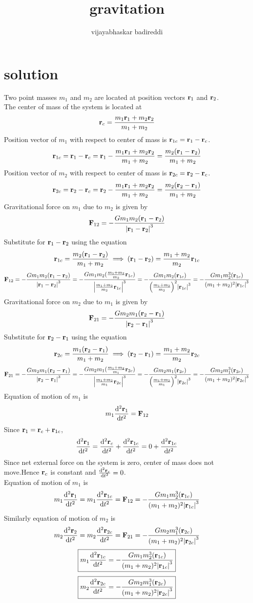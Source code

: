\documentclass[12pt]{article}
\title{gravitation}
\author{vijayabhaskar badireddi}
\begin{document}
\section*{solution}
Two point masses $m_1$ and $m_2$ are located at position vectors $\vb{r}_1$ and $\vb{r}_2$.\\ The center of mass of the system is located at 
\[\vb{r}_c=\frac{m_1\vb{r}_1+m_2\vb{r}_2}{m_1+m_2}\]
Position vector of $m_1$ with respect to center of mass is $\vb{r}_{1c}=\vb{r}_1-\vb{r}_c$.
\[\vb{r}_{1c}=\vb{r}_1-\vb{r}_c=\vb{r}_1-\frac{m_1\vb{r}_1+m_2\vb{r}_2}{m_1+m_2}=\frac{m_2(\vb{r}_1-\vb{r}_2)}{m_1+m_2}\]
Position vector of $m_2$ with respect to center of mass is $\vb{r}_{2c}=\vb{r}_2-\vb{r}_c$.
\[\vb{r}_{2c}=\vb{r}_2-\vb{r}_c=\vb{r}_2-\frac{m_1\vb{r}_1+m_2\vb{r}_2}{m_1+m_2}=\frac{m_2(\vb{r}_2-\vb{r}_1)}{m_1+m_2}\]
Gravitational force on $m_1$ due to $m_2$ is given by 
\[\vb{F}_{12}=-\frac{Gm_1m_2(\vb{r}_1-\vb{r}_2)}{\vqty{\vb{r}_1-\vb{r}_2}^3}\]
Substitute for $\vb{r}_1-\vb{r}_2$ using the equation \[\vb{r}_{1c}=\frac{m_2(\vb{r}_1-\vb{r}_2)}{m_1+m_2}\implies(\vb{r}_1-\vb{r}_2)=\frac{m_1+m_2}{m_2}\vb{r}_{1c}\]
\[\vb{F}_{12}=-\frac{Gm_1m_2(\vb{r}_1-\vb{r}_2)}{\vqty{\vb{r}_1-\vb{r}_2}^3}=-\frac{Gm_1m_2(\frac{m_1+m_2}{m_2}\vb{r}_{1c})}{\vqty{\frac{m_1+m_2}{m_2}\vb{r}_{1c}}^3}=-\frac{Gm_1m_2(\vb{r}_{1c})}{\qty(\frac{m_1+m_2}{m_2})^2\vqty{\vb{r}_{1c}}^3}=-\frac{Gm_1m_2^3(\vb{r}_{1c})}{(m_1+m_2)^2\vqty{\vb{r}_{1c}}^3}\]
Gravitational force on $m_2$ due to $m_1$ is given by 
\[\vb{F}_{21}=-\frac{Gm_2m_1(\vb{r}_2-\vb{r}_1)}{\vqty{\vb{r}_2-\vb{r}_1}^3}\]
Substitute for $\vb{r}_2-\vb{r}_1$ using the equation \[\vb{r}_{2c}=\frac{m_1(\vb{r}_2-\vb{r}_1)}{m_1+m_2}\implies(\vb{r}_2-\vb{r}_1)=\frac{m_1+m_2}{m_2}\vb{r}_{2c}\]
\[\vb{F}_{21}=-\frac{Gm_2m_1(\vb{r}_2-\vb{r}_1)}{\vqty{\vb{r}_2-\vb{r}_1}^3}=-\frac{Gm_2m_1(\frac{m_1+m_2}{m_1}\vb{r}_{2c})}{\vqty{\frac{m_1+m_2}{m_1}\vb{r}_{2c}}^3}=-\frac{Gm_2m_1(\vb{r}_{2c})}{\qty(\frac{m_1+m_2}{m_1})^2\vqty{\vb{r}_{2c}}^3}=-\frac{Gm_2m_1^3(\vb{r}_{2c})}{(m_1+m_2)^2\vqty{\vb{r}_{2c}}^3}\]
Equation of motion of $m_1$ is \[m_1\dv[2]{\vb{r}_1}{t}=\vb{F}_{12}\]
Since $\vb{r}_1=\vb{r}_c+\vb{r}_{1c}$,
\[\dv[2]{\vb{r}_1}{t}=\dv[2]{\vb{r}_c}{t}+\dv[2]{\vb{r}_{1c}}{t}=0+\dv[2]{\vb{r}_{1c}}{t}\]
Since net external force on the system is zero, center of mass does not move.Hence $\vb{r}_c$ is constant and $\dv[2]{\vb{r}_c}{t}=0$.\\
Equation of motion of $m_1$ is \[m_1\dv[2]{\vb{r}_1}{t}=m_1\dv[2]{\vb{r}_{1c}}{t}=\vb{F}_{12}=-\frac{Gm_1m_2^3(\vb{r}_{1c})}{(m_1+m_2)^2\vqty{\vb{r}_{1c}}^3}\]
Similarly equation of motion of $m_2$ is \[m_2\dv[2]{\vb{r}_2}{t}=m_2\dv[2]{\vb{r}_{2c}}{t}=\vb{F}_{21}=-\frac{Gm_2m_1^3(\vb{r}_{2c})}{(m_1+m_2)^2\vqty{\vb{r}_{2c}}^3}\]
\[\boxed{m_1\dv[2]{\vb{r}_{1c}}{t}=-\frac{Gm_1m_2^3(\vb{r}_{1c})}{(m_1+m_2)^2\vqty{\vb{r}_{1c}}^3}}\]
\[\boxed{m_2\dv[2]{\vb{r}_{2c}}{t}=-\frac{Gm_2m_1^3(\vb{r}_{2c})}{(m_1+m_2)^2\vqty{\vb{r}_{2c}}^3}}\]
\end{document}
